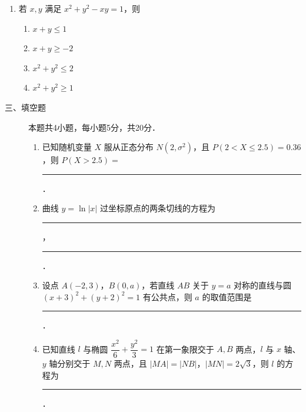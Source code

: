 \begin{description}
\begin{enumerate}[leftmargin=5pt]
        \item 若 $x,y$ 满足 $x^2+y^2-xy=1$，则
        \begin{enumerate}[label=\Alph*.]
            \item $x+y\leqslant1$
            \item $x+y\geqslant-2$
            \item $x^2+y^2\leqslant2$
            \item $x^2+y^2\geqslant1$
        \end{enumerate}
    \end{enumerate}
\end{description}

\begin{description}
    \item[三、填空题] 本题共4小题，每小题5分，共20分．
    \begin{enumerate}[leftmargin=5pt]
      \addtocounter{enumi}{+12}
        \item 已知随机变量 $X$ 服从正态分布 $N(2,\sigma^2)$，且 $P(2<X\leqslant2.5)=0.36$，则 $P(X>2.5)=$ \rule[-0.3ex]{3em}{0.4pt}．
        \item 曲线 $y=\ln|x|$ 过坐标原点的两条切线的方程为 \rule[-0.3ex]{3em}{0.4pt}，\rule[-0.3ex]{3em}{0.4pt}．
        \item 设点 $A(-2,3)$，$B(0,a)$，若直线 $AB$ 关于 $y=a$ 对称的直线与圆 $(x+3)^2+(y+2)^2=1$ 有公共点，则 $a$ 的取值范围是 \rule[-0.3ex]{3em}{0.4pt}．
        \item 已知直线 $l$ 与椭圆 $\dfrac{x^2}{6}+\dfrac{y^2}{3}=1$ 在第一象限交于 $A,B$ 两点，$l$ 与 $x$ 轴、$y$ 轴分别交于 $M,N$ 两点，且 $|MA|=|NB|$，$|MN|=2\sqrt{3}$，则 $l$ 的方程为 \rule[-0.3ex]{3em}{0.4pt}．
    \end{enumerate}
\end{description}

